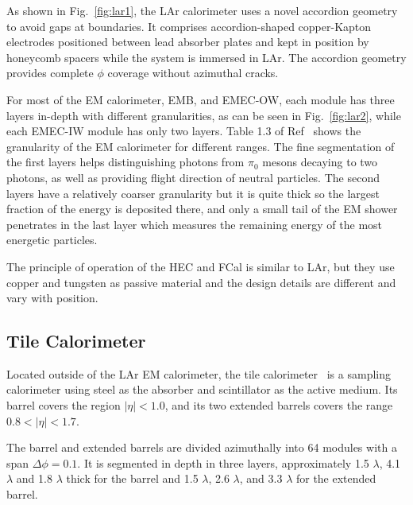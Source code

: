 \par As shown in Fig.~\ref{fig:lar1}, the LAr calorimeter uses a novel accordion geometry to avoid gaps at boundaries. It comprises accordion-shaped copper-Kapton electrodes positioned between lead absorber plates and kept in position by honeycomb spacers while the system is immersed in LAr. The accordion geometry provides complete $\phi$ coverage without azimuthal cracks.

\par For most of the EM calorimeter, EMB, and EMEC-OW, each module has three layers in-depth with different granularities, 
as can be seen in Fig.~\ref{fig:lar2}, while each EMEC-IW module has only two layers. Table 1.3 of Ref~\cite{Aad:1129811} 
shows the granularity of the EM calorimeter for different ranges. The fine segmentation of the first layers helps distinguishing photons from $\pi_0$ mesons decaying to two photons, as well as providing flight direction of neutral particles. The second layers have a relatively coarser granularity but it is quite thick so the largest fraction of the energy is deposited there, and only a small tail of the EM shower penetrates in the last layer which measures the remaining energy of the most energetic particles.

\par The principle of operation of the HEC and FCal is similar to LAr, but they use copper and tungsten as passive material and the design details are different and vary with position.

\subsection{Tile Calorimeter}

\par Located outside of the LAr EM calorimeter, the tile calorimeter~\cite{CERN-LHCC-96-042} is a sampling calorimeter using steel as the absorber and scintillator as the active medium. Its barrel covers the region $|\eta| < 1.0$, and its two extended barrels covers the range $0.8 < |\eta| < 1.7$.

\par The barrel and extended barrels are divided azimuthally into 64 modules with a span $\Delta \phi = 0.1$. It is segmented in depth in three layers, approximately 1.5 $\lambda$, 4.1 $\lambda$ and 1.8 $\lambda$ thick for the barrel and 1.5 $\lambda$, 2.6 $\lambda$, and 3.3 $\lambda$ for the extended barrel.

